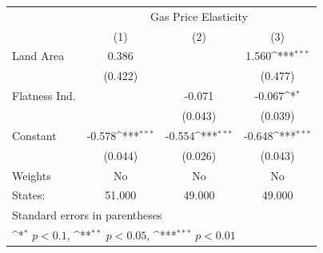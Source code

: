 {
\def\sym#1{\ifmmode^{#1}\else\(^{#1}\)\fi}
\begin{tabular}{l*{3}{c}}
\hline\hline
            &\multicolumn{3}{c}{Gas Price Elasticity}                         \\
            &\multicolumn{1}{c}{(1)}         &\multicolumn{1}{c}{(2)}         &\multicolumn{1}{c}{(3)}         \\
\hline
Land Area   &       0.386         &                     &       1.560\sym{***}\\
            &     (0.422)         &                     &     (0.477)         \\
[1em]
Flatness Ind.&                     &      -0.071         &      -0.067\sym{*}  \\
            &                     &     (0.043)         &     (0.039)         \\
[1em]
Constant    &      -0.578\sym{***}&      -0.554\sym{***}&      -0.648\sym{***}\\
            &     (0.044)         &     (0.026)         &     (0.043)         \\
\hline
Weights     &          No         &          No         &          No         \\
States:     &      51.000         &      49.000         &      49.000         \\
\hline\hline
\multicolumn{4}{l}{\footnotesize Standard errors in parentheses}\\
\multicolumn{4}{l}{\footnotesize \sym{*} \(p<0.1\), \sym{**} \(p<0.05\), \sym{***} \(p<0.01\)}\\
\end{tabular}
}
